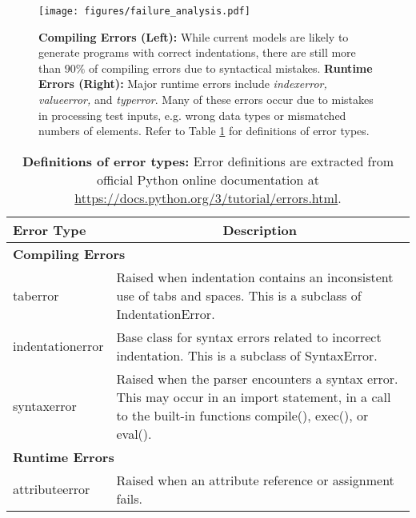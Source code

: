 \documentclass{article}
\begin{document}
\begin{figure}[t]
	\centering
	\resizebox{1.0\textwidth}{!} {
	\texttt{[image: figures/failure\_analysis.pdf]}
	}
	\caption{
	\textbf{Compiling Errors (Left):}
	While current models are likely to generate programs with correct indentations, there are still more than $90\%$ of compiling errors due to syntactical mistakes.
	\textbf{Runtime Errors (Right):}
	Major runtime errors include \emph{indexerror, valueerror,} and \emph{typerror}. 
	Many of these errors occur due to mistakes in processing test inputs, e.g. wrong data types or mismatched numbers of elements. 
	Refer to Table \ref{app_tab:error_definition} for definitions of error types.
	}
	\label{app_fig:failure_analysis}
\end{figure}


\begin{table}[t]
\centering
\small
\caption{
\textbf{Definitions of error types:}
Error definitions are extracted from official Python online documentation at \url{https://docs.python.org/3/tutorial/errors.html}.
}
\label{app_tab:error_definition}
\begin{tabular}{p{}p{}}
\hline
\textbf{Error Type}        & \multicolumn{1}{c}{\textbf{Description}}                                                                                                                            \\
\hline
\multicolumn{2}{l}{\textbf{Compiling Errors}}                                                                                                                                            \\
taberror          & Raised when indentation contains an inconsistent use of tabs and spaces. This is a subclass of IndentationError.                                           \\
indentationerror  & Base class for syntax errors related to incorrect indentation. This is a subclass of SyntaxError.                                                          \\
syntaxerror       & Raised when the parser encounters a syntax error. This may occur in an import statement, in a call to the built-in functions compile(), exec(), or eval(). \\
\hline
\multicolumn{2}{l}{\textbf{Runtime Errors}}                                                                                                                                              \\
attributeerror    & Raised when an attribute reference or assignment fails.                                                                                                    \\

\end{tabular}
\end{table}
\end{document}

